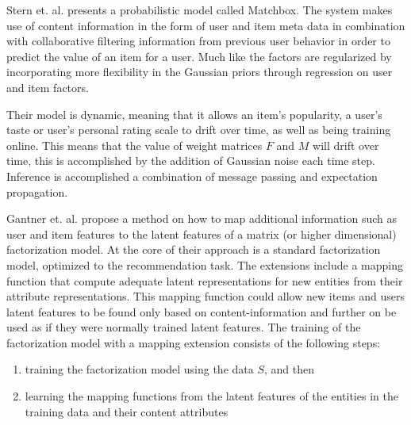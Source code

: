 
Stern et. al. \cite{Stern2009} presents a probabilistic model called Matchbox. The system makes use of content information in the form of user and
item meta data in combination with collaborative filtering information from previous user behavior in order to predict the value of an item for a user. Much like \cite{Agarwal2009} the factors are regularized by incorporating more flexibility in the Gaussian priors through regression on user and item factors.

Their model is dynamic, meaning that it allows an item's popularity, a user's taste or user's personal rating scale to drift over time, as well as being training online. This means that the value of weight matrices $F$ and $M$ will drift over time, this is accomplished by the addition of Gaussian noise each time step. Inference is accomplished a combination of message passing and expectation propagation.


Gantner et. al. \cite{Gantner2010} propose a method on how to map additional
information such as user and item features to the latent features of a matrix
(or higher dimensional) factorization model. At the core of their approach is a
standard factorization model, optimized to the recommendation task. The
extensions include a mapping function that compute adequate latent
representations for new entities from their attribute representations. This
mapping function could allow new items and users latent features to be found
only based on content-information and further on be used as if they were
normally trained latent features. The training of the factorization model with
a mapping extension consists of the following steps:

\begin{enumerate}
\item training the factorization model using the data $S$, and then
\item learning the mapping functions from the latent features of the entities in the training data and their content attributes
\end{enumerate}

